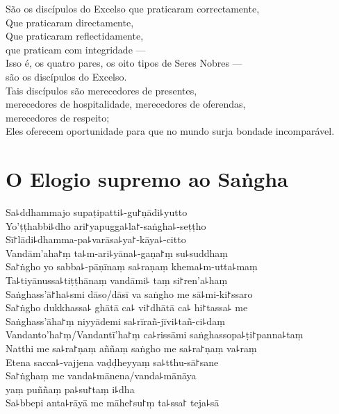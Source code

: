 São os discípulos do Excelso que praticaram correctamente,\\
Que praticaram directamente,\\
Que praticaram reflectidamente,\\
 que praticam com integridade ---\\
Isso é, os quatro pares, os oito tipos de Seres Nobres ---\\
 são os discípulos do Excelso.\\
Tais discípulos são merecedores de presentes,\\
\vin merecedores de hospitalidade, merecedores de oferendas,\\
\vin merecedores de respeito;\\
Eles oferecem oportunidade para que no mundo surja bondade incomparável.

\clearpage

\chapter*{O Elogio supremo ao Saṅgha}

\begin{leader}
\end{leader}

Sa꜕ddhammajo supaṭipatti꜕-gu꜓ṇādi꜕yutto\\
Yo'ṭṭhabbi꜕dho ari꜓yapugga꜕la꜓-saṅgha꜕-seṭṭho\\
Sī꜓lādi꜕dhamma-pa꜕varāsa꜕ya꜓-kāya꜕-citto\\
Vandām'aha꜓ṃ ta꜕m-ari꜕yāna꜕-gaṇa꜓ṃ su꜕suddhaṃ\\
Sa꜓ṅgho yo sabba꜕-pāṇīnaṃ sa꜕raṇaṃ khema꜕m-utta꜕maṃ\\
Ta꜕tiyānussa꜕tiṭṭhānaṃ vandāmi꜕ taṃ si꜓ren'a꜕haṃ\\
Saṅghass'ā꜓ha꜕smi dāso/dāsī va saṅgho me sā꜕mi-ki꜓ssaro\\
Sa꜓ṅgho dukkhassa꜕ ghātā ca꜕ vi꜓dhātā ca꜕ hi꜓tassa꜕ me\\
Saṅghass'āha꜓ṃ niyyādemi sa꜕rīrañ-jīvi꜕tañ-ci꜕daṃ\\
Vandanto'ha꜓ṃ/Vandantī'ha꜓ṃ ca꜕rissāmi saṅghassopa꜕ṭi꜓panna꜕taṃ\\
Natthi me sa꜕ra꜓ṇaṃ aññaṃ saṅgho me sa꜕ra꜓ṇaṃ va꜕raṃ\\
Etena sacca꜕-vajjena vaḍḍheyyaṃ sa꜕tthu-sā꜓sane\\
Sa꜓ṅghaṃ me vanda꜕mānena/vanda꜕mānāya\\
\vin yaṃ puññaṃ pa꜕su꜓taṃ i꜕dha\\
Sa꜕bbepi anta꜕rāyā me māhe꜓su꜓ṃ ta꜕ssa꜓ teja꜕sā

